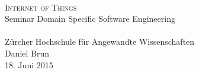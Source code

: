 




\begin{titlepage}
   \mbox{}\vspace{5\baselineskip}\\
   \rmfamily\huge
   \centering
   \textsc{Internet of Things} \\[2ex]
   Seminar Domain Specific Software Engineering
   \rmfamily\Large
   \vspace{1\baselineskip}\\
   \mbox{}
   \vspace{3\baselineskip}\\
   Zürcher Hochschule für Angewandte Wissenschaften
   \vspace{5\baselineskip}\\
   \rmfamily\Large
   Daniel Brun
   \vspace{1\baselineskip}\\
   18. Juni 2015
\end{titlepage}
 



% 
